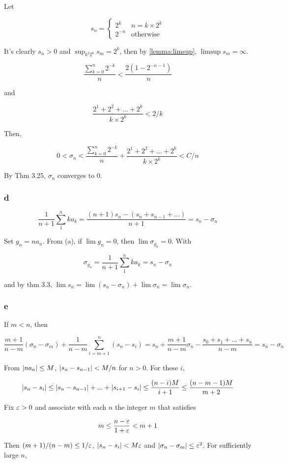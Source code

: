\documentclass[11pt]{article}
\begin{document}
Let

\[
s_n = \begin{cases}
    2^k & n=k\times 2^k \\
    2^{-n} & \text{otherwise}
\end{cases}
\]

It's clearly $s_n>0$ and $\sup_{k^2 2^k} s_m = 2^k$, then by \cref{lemma:limsup}, $\limsup s_m = \infty$.

\[
    \frac{\sum_{k=0}^{n} 2^{-k}}{n} < \frac{2(1-2^{-n-1})}{n}
\]

and

\[
\frac{2^1+2^2+...+2^k}{k\times2^k} < 2/k
\]

Then,

\[
0 < \sigma_n < \frac{\sum_{k=0}^{n} 2^{-k}}{n} + \frac{2^1+2^2+...+2^k}{k\times2^k} < C/n
\]

By Thm 3.25, $\sigma_n$ converges to $0$.

\subsubsection*{d}

\[
\frac{1}{n+1}\sum_{1}^{n} ka_k =\frac{(n+1)s_n-(s_n+s_{n-1}+...)}{n+1}=s_n-\sigma_n
\]

Set $g_n=na_n$. From (a), if $\lim g_n=0$, then $\lim \sigma_{g_n}=0$. With 

\[
\sigma_{g_n}=\frac{1}{n+1}\sum_{1}^{n} ka_k=s_n-\sigma_n
\]

and by thm 3.3, $\lim s_n = \lim (s_n-\sigma_n) + \lim \sigma_n = \lim \sigma_n$.

\subsubsection*{e}

If $m < n$, then 

\[
\frac{m+1}{n-m}(\sigma_n-\sigma_m)+\frac{1}{n-m} \sum_{i=m+1}^n (s_n - s_i) = s_n+\frac{m+1}{n-m}\sigma_n - \frac{s_0+s_1+...+s_{n}}{n-m}=s_n-\sigma_n
\]

From $\lvert na_n\rvert \leq M$, $\lvert s_n-s_{n-1}\rvert<M/n$ for $n>0$. For these $i$,

\[
|s_n-s_i|\leq \lvert s_n-s_{n-1}\rvert+...+\lvert s_{i+1}-s_i\rvert \leq \frac{(n-i)M}{i+1} \leq \frac{(n-m-1)M}{m+2}
\]

Fix $\varepsilon > 0$ and associate with each $n$ the integer $m$ that satisfies

\[
m \leq \frac{n-\varepsilon}{1+\varepsilon} < m+1
\]

Then $(m+1)/(n-m) \leq 1/\varepsilon$, $\lvert s_n-s_i\rvert < M\varepsilon$ and $\lvert\sigma_n-\sigma_m\rvert\leq \varepsilon^2$. For sufficiently large $n$, 
\end{document}
